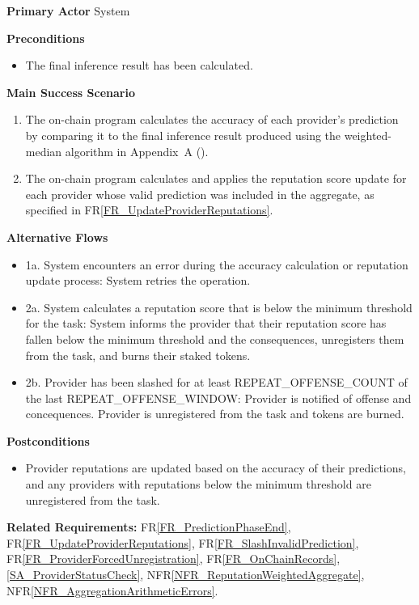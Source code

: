 \documentclass[12pt]{article}
\newcommand{\rref}[1]{FR\ref{#1}}
\newcommand{\nfrref}[1]{NFR\ref{#1}}
\begin{document}
\textbf{Primary Actor}
System

\textbf{Preconditions}
\begin{itemize}
\item The final inference result has been calculated.
\end{itemize}

\textbf{Main Success Scenario}
\begin{enumerate}

\item The on-chain program calculates the accuracy of each provider's
prediction by comparing it to the final inference result produced using the
weighted-median algorithm in Appendix~A ().
\item The on-chain program calculates and applies the reputation score update
for each provider whose valid prediction was included in the aggregate, as
specified in \rref{FR_UpdateProviderReputations}.
\end{enumerate}

\textbf{Alternative Flows}
\begin{itemize}
\item 1a. System encounters an error during the accuracy calculation or reputation update process: System retries the operation.
\item 2a. System calculates a reputation score that is below the minimum threshold for the task: System informs the provider that their reputation score has fallen below the minimum threshold and the consequences, unregisters them from the task, and burns their staked tokens.
\item 2b. Provider has been slashed for at least REPEAT\_OFFENSE\_COUNT of the last REPEAT\_OFFENSE\_WINDOW: Provider is notified of offense and concequences. Provider is unregistered from the task and tokens are burned.
\end{itemize}

\textbf{Postconditions}
\begin{itemize}
\item Provider reputations are updated based on the accuracy of their predictions, and any providers with reputations below the minimum threshold are unregistered from the task.
\end{itemize}

\textbf{Related Requirements:} \rref{FR_PredictionPhaseEnd}, \rref{FR_UpdateProviderReputations}, \rref{FR_SlashInvalidPrediction}, \rref{FR_ProviderForcedUnregistration}, \rref{FR_OnChainRecords}, \ref{SA_ProviderStatusCheck}, \nfrref{NFR_ReputationWeightedAggregate}, \nfrref{NFR_AggregationArithmeticErrors}.
\end{document}
